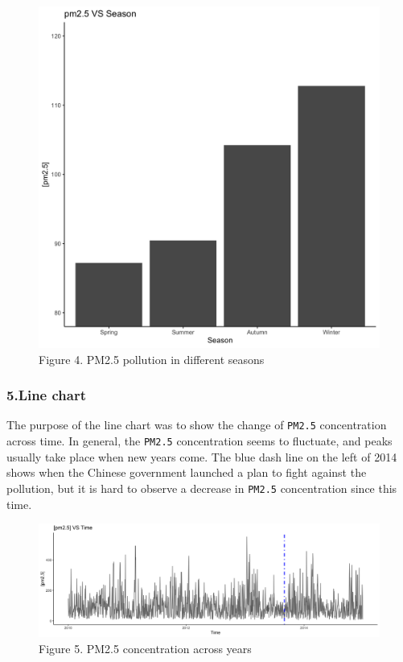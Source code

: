 \documentclass[]{article}
\begin{document}
\begin{figure}
\centering
\includegraphics{../images/season_PM2.5.png}
\caption{Figure 4. PM2.5 pollution in different seasons}
\end{figure}

\hypertarget{line-chart}{%
\subsubsection{5.Line chart}\label{line-chart}}

The purpose of the line chart was to show the change of \texttt{PM2.5}
concentration across time. In general, the \texttt{PM2.5} concentration
seems to fluctuate, and peaks usually take place when new years come.
The blue dash line on the left of 2014 shows when the Chinese government
launched a plan to fight against the pollution, but it is hard to
observe a decrease in \texttt{PM2.5} concentration since this time.

\begin{figure}
\centering
\includegraphics{../images/year_PM2.5.png}
\caption{Figure 5. PM2.5 concentration across years}
\end{figure}
\end{document}
